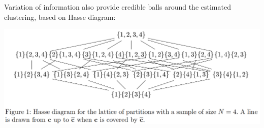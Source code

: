 \begin{frame}{Variation of information}
\citet{wade2018bayesian} 
also provide \alert{credible balls} around the estimated clustering, based on Hasse diagram:\bigskip

\includegraphics[width=\textwidth]{figures_julyan/mixtures/hasse_diagram}
\end{frame}